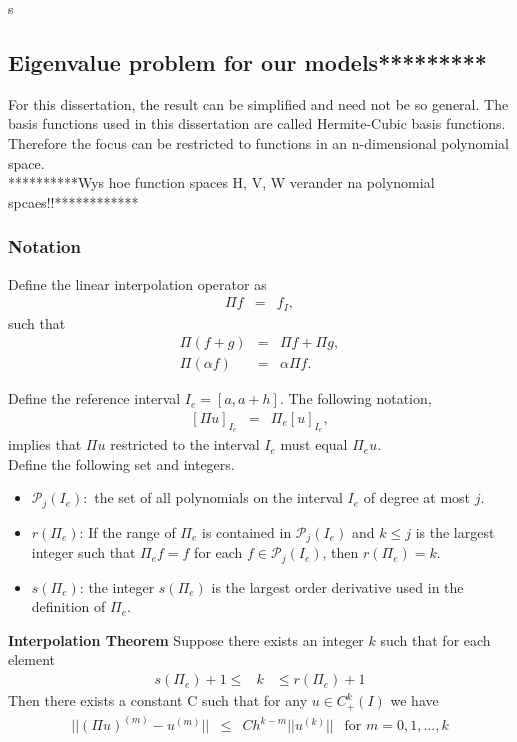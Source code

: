 s\documentclass[../../main.tex]{subfiles}
\begin{document}
\subsection{Eigenvalue problem for our models*********}
For this dissertation, the result can be simplified and need not be so general. The basis functions used in this dissertation are called Hermite-Cubic basis functions. Therefore the focus can be restricted to functions in an n-dimensional polynomial space.\\
**********Wys hoe function spaces H, V, W verander na polynomial spcaes!!************

\subsubsection{Notation}
Define the linear interpolation operator as
\begin{eqnarray*}
	\Pi f &=& f_{I},
\end{eqnarray*} such that
\begin{eqnarray*}
	\Pi (f+g) &=& \Pi f + \Pi g, \\
	\Pi (\alpha f) &=& \alpha \Pi f.
\end{eqnarray*}

Define the reference interval $I_{e} = [a, a+h]$. The following notation,
\begin{eqnarray*}
	\left[\Pi u \right]_{I_{e}} &=& \Pi_{e} \left[u\right]_{I_{e}},
\end{eqnarray*} implies that $\Pi u$ restricted to the interval $I_{e}$ must equal $\Pi_{e} u$.\\

Define the following set and integers.
\begin{itemize}
	\item[] $\mathcal{P}_{j}(I_{e}):$ the set of all polynomials on the interval $I_{e}$ of degree at most $j$.\\
	
	\item[] $r(\Pi_{e})$: If the range of $\Pi_{e}$ is contained in $\mathcal{P}_{j}(I_{e})$ and $k\leq j$ is the largest integer such that $\Pi_{e} f = f$ for each $f\in\mathcal{P}_{j}(I_{e})$, then $r(\Pi_{e}) = k$.\\
	
	\item[] $s(\Pi_{e})$: the integer $s(\Pi_{e})$ is the largest order derivative used in the definition of $\Pi_{e}$.
\end{itemize}
\textbf{Interpolation Theorem} Suppose there exists an integer $k$ such that for each element
\begin{eqnarray*}
	s(\Pi_{e}) + 1 \leq & k & \leq r(\Pi_{e}) + 1
\end{eqnarray*}
Then there exists a constant C such that for any $u\in C^{k}_{+}(I)$ we have
\begin{eqnarray*}
	||(\Pi u)^{(m)} - u^{(m)}|| & \leq & Ch^{k-m}||u^{(k)}|| \ \ \textrm{ for } m = 0,1,...,k
\end{eqnarray*}
\end{document}
